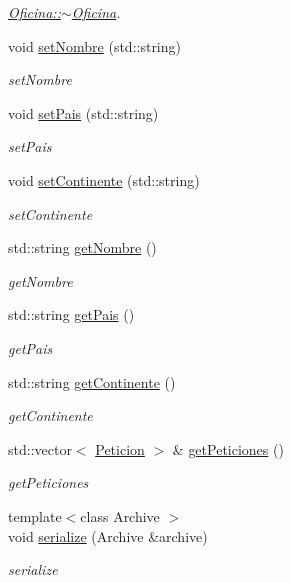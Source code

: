 \begin{DoxyCompactItemize}
\begin{DoxyCompactList}\small\item\em \hyperlink{classOficina_a34125758ffc92b87f19e21d24cb92c60}{Oficina\+::$\sim$\+Oficina}. \end{DoxyCompactList}\item 
void \hyperlink{classOficina_ae016add6b9338df63c58a850b3503d45}{set\+Nombre} (std\+::string)
\begin{DoxyCompactList}\small\item\em set\+Nombre \end{DoxyCompactList}\item 
void \hyperlink{classOficina_a69be721387f2b3b97b0c6a6326d046e5}{set\+Pais} (std\+::string)
\begin{DoxyCompactList}\small\item\em set\+Pais \end{DoxyCompactList}\item 
void \hyperlink{classOficina_a0b715231faa1dc769fd6006f8136626f}{set\+Continente} (std\+::string)
\begin{DoxyCompactList}\small\item\em set\+Continente \end{DoxyCompactList}\item 
std\+::string \hyperlink{classOficina_ad9ef736810c608638d70fd003db62661}{get\+Nombre} ()
\begin{DoxyCompactList}\small\item\em get\+Nombre \end{DoxyCompactList}\item 
std\+::string \hyperlink{classOficina_aef61125dc2cbbe125b4c027196e9cbb3}{get\+Pais} ()
\begin{DoxyCompactList}\small\item\em get\+Pais \end{DoxyCompactList}\item 
std\+::string \hyperlink{classOficina_a937105d318a0554fe2ce00cd59f35160}{get\+Continente} ()
\begin{DoxyCompactList}\small\item\em get\+Continente \end{DoxyCompactList}\item 
std\+::vector$<$ \hyperlink{classPeticion}{Peticion} $>$ \& \hyperlink{classOficina_ab496b537dfe209239796f7f0832dd1b8}{get\+Peticiones} ()
\begin{DoxyCompactList}\small\item\em get\+Peticiones \end{DoxyCompactList}\item 
{\footnotesize template$<$class Archive $>$ }\\void \hyperlink{classOficina_af600ad5dff1f832387e48f2d88bd2b72}{serialize} (Archive \&archive)
\begin{DoxyCompactList}\small\item\em serialize \end{DoxyCompactList}\end{DoxyCompactItemize}


